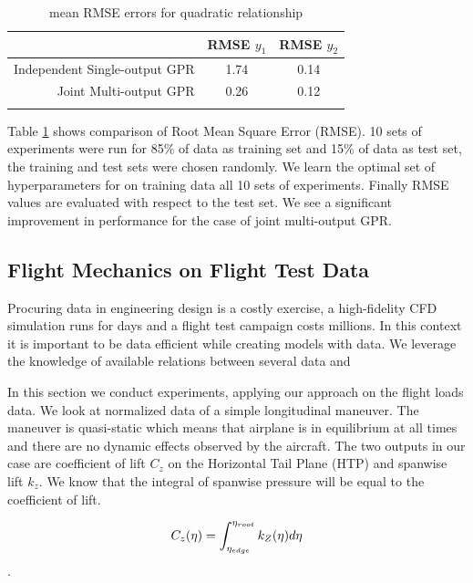 \begin{table}
\caption{mean RMSE errors for quadratic relationship}
\centering
\label{t:observed_psrs}
\begin{tabular}{rcc}
\noalign{\smallskip} \hline \hline \noalign{\smallskip}
 & RMSE \(y_{1}\) & RMSE \(y_{2}\) \\
\hline
Independent Single-output GPR & 1.74 & 0.14 \\
Joint Multi-output GPR & 0.26 & 0.12 \\
\noalign{\smallskip} \hline \noalign{\smallskip}
\end{tabular}
\label{table:rmseY1Y2}
\end{table}

Table \ref{table:rmseY1Y2} shows comparison of Root Mean Square Error (RMSE). 10 sets of experiments were run for 85\% of data as training set and 15\% of data as test set, the training and test sets were chosen randomly. We learn the optimal set of hyperparameters for on training data all 10 sets of experiments. Finally RMSE values are evaluated with respect to the test set. We see a significant improvement in performance for the case of joint multi-output GPR. 

\subsection{Flight Mechanics on Flight Test Data}\label{sub:experimentsFlightLoadsData}
Procuring data in engineering design is a costly exercise, a high-fidelity CFD simulation runs for days and a flight test campaign costs millions. In this context it is important to be data efficient while creating models with data. We leverage the knowledge of available relations between several data and 


In this section we conduct experiments, applying our approach on the flight loads data. We look at normalized data of a simple longitudinal maneuver. The maneuver is quasi-static which means that airplane is in equilibrium at all times and there are no dynamic effects observed by the aircraft. The two outputs in our case are coefficient of lift \(C_{z}\) on the Horizontal Tail Plane (HTP) and spanwise lift \(k_{z}\). We know that the integral of spanwise pressure will be equal to the coefficient of lift.

\begin{equation}\label{eq:relationCzKz}
\centering
C_{z}(\eta) = \int_{\eta_{edge}}^{\eta_{root}} k_{Z}(\eta)d\eta
\end{equation}.

